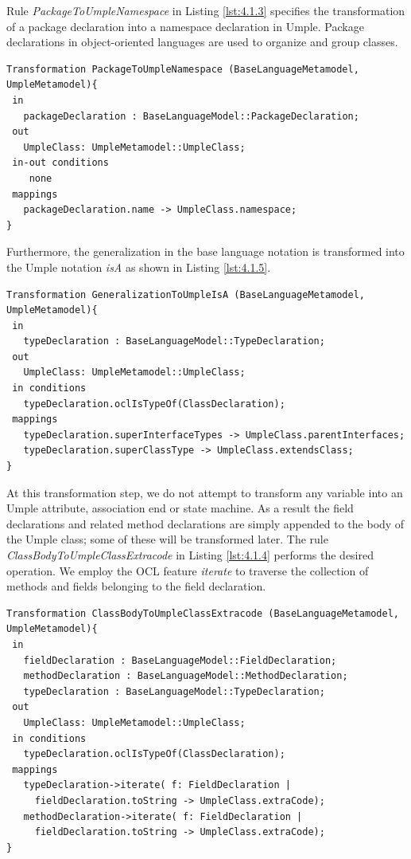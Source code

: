 Rule \textit{PackageToUmpleNamespace} in Listing \ref{lst:4.1.3} specifies the transformation of a package declaration into a namespace declaration in Umple. Package declarations in object-oriented languages are used to organize and group classes.

\begin{lstlisting}[style=mine,caption=Rule PackageToUmpleNamespace,label=lst:4.1.3]
Transformation PackageToUmpleNamespace (BaseLanguageMetamodel, UmpleMetamodel){ 
 in
   packageDeclaration : BaseLanguageModel::PackageDeclaration;
 out
   UmpleClass: UmpleMetamodel::UmpleClass;
 in-out conditions
    none
 mappings
   packageDeclaration.name -> UmpleClass.namespace;
}
\end{lstlisting}

Furthermore, the generalization in the base language notation is transformed into the Umple notation \textit{isA} as shown in Listing \ref{lst:4.1.5}.

\begin{lstlisting}[style=mine,caption=Rule GeneralizationToUmpleIsA,label=lst:4.1.5]
Transformation GeneralizationToUmpleIsA (BaseLanguageMetamodel, UmpleMetamodel){ 
 in
   typeDeclaration : BaseLanguageModel::TypeDeclaration;
 out
   UmpleClass: UmpleMetamodel::UmpleClass;
 in conditions
   typeDeclaration.oclIsTypeOf(ClassDeclaration);   
 mappings
   typeDeclaration.superInterfaceTypes -> UmpleClass.parentInterfaces;
   typeDeclaration.superClassType -> UmpleClass.extendsClass;
}
\end{lstlisting}

At this transformation step, we do not attempt to transform any variable into an Umple attribute, association end or state machine. As a result the field declarations and related method declarations are simply appended to the body of the Umple class; some of these will be transformed later. The rule \textit{ClassBodyToUmpleClassExtracode} in Listing \ref{lst:4.1.4} performs the desired operation. We employ the OCL feature \textit{iterate} to traverse the collection of methods and fields belonging to the field declaration. 

\begin{lstlisting}[style=mine,caption=Rule ClassBodyToUmpleClassExtracode,label=lst:4.1.4]
Transformation ClassBodyToUmpleClassExtracode (BaseLanguageMetamodel, UmpleMetamodel){ 
 in
   fieldDeclaration : BaseLanguageModel::FieldDeclaration;
   methodDeclaration : BaseLanguageModel::MethodDeclaration;
   typeDeclaration : BaseLanguageModel::TypeDeclaration;
 out
   UmpleClass: UmpleMetamodel::UmpleClass;
 in conditions
   typeDeclaration.oclIsTypeOf(ClassDeclaration);   
 mappings
   typeDeclaration->iterate( f: FieldDeclaration | 
     fieldDeclaration.toString -> UmpleClass.extraCode);
   methodDeclaration->iterate( f: FieldDeclaration | 
     fieldDeclaration.toString -> UmpleClass.extraCode);
}
\end{lstlisting}

